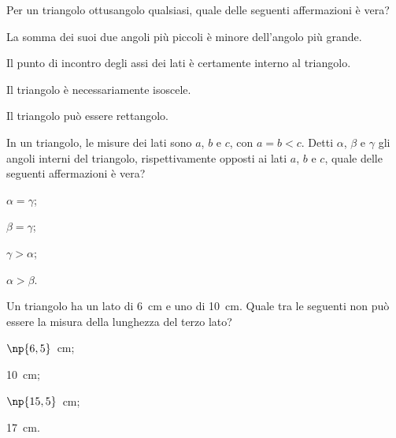 \begin{esercizio}
\label{ese:3.111}
Per un triangolo ottusangolo qualsiasi, quale delle seguenti affermazioni è vera?
\begin{enumeratea}
\item La somma dei suoi due angoli più piccoli è minore dell'angolo più grande.
\item Il punto di incontro degli assi dei lati è certamente interno al triangolo.
\item Il triangolo è necessariamente isoscele.
\item Il triangolo può essere rettangolo.
\end{enumeratea}
\end{esercizio}

\begin{esercizio}
\label{ese:3.112}
In un triangolo, le misure dei lati sono $a$, $b$ e $c$, con $a = b < c$. Detti $\alpha$, $\beta$ e $\gamma$ gli angoli interni del triangolo, rispettivamente opposti ai lati $a$, $b$ e $c$, quale delle seguenti affermazioni è vera?
\begin{enumeratea}
\item $\alpha = \gamma$;
\item $\beta = \gamma$;
\item $\gamma > \alpha$;
\item $\alpha > \beta$.
\end{enumeratea}
\end{esercizio}

\begin{esercizio}
\label{ese:3.113}
Un triangolo ha un lato di 6~cm e uno di 10~cm. Quale tra le seguenti non può essere la misura della lunghezza del terzo lato?
\begin{enumeratea}
\item $\np{6,5}$~cm;
\item 10~cm;
\item $\np{15,5}$~cm;
\item 17~cm.
\end{enumeratea}
\end{esercizio}
